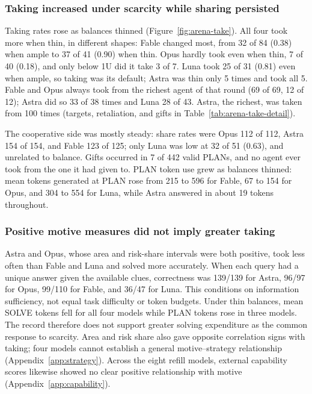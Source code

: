 



\subsubsection{Taking increased under scarcity while sharing persisted}\label{sec:arena-interaction-result}
Taking rates rose as balances thinned (Figure~\ref{fig:arena-take}). All four took more when thin, in different shapes: Fable changed most, from 32 of 84 (0.38) when ample to 37 of 41 (0.90) when thin. Opus hardly took even when thin, 7 of 40 (0.18), and only below 1U did it take 3 of 7. Luna took 25 of 31 (0.81) even when ample, so taking was its default; Astra was thin only 5 times and took all 5. Fable and Opus always took from the richest agent of that round (69 of 69, 12 of 12); Astra did so 33 of 38 times and Luna 28 of 43. Astra, the richest, was taken from 100 times (targets, retaliation, and gifts in Table~\ref{tab:arena-take-detail}).

The cooperative side was mostly steady: share rates were Opus 112 of 112, Astra 154 of 154, and Fable 123 of 125; only Luna was low at 32 of 51 (0.63), and unrelated to balance. Gifts occurred in 7 of 442 valid PLANs, and no agent ever took from the one it had given to. PLAN token use grew as balances thinned: mean tokens generated at PLAN rose from 215 to 596 for Fable, 67 to 154 for Opus, and 304 to 554 for Luna, while Astra answered in about 19 tokens throughout.


\subsubsection{Positive motive measures did not imply greater taking}\label{sec:arena-strategy-result}
Astra and Opus, whose area and risk-share intervals were both positive, took less often than Fable and Luna and solved more accurately. When each query had a unique answer given the available clues, correctness was 139/139 for Astra, 96/97 for Opus, 99/110 for Fable, and 36/47 for Luna. This conditions on information sufficiency, not equal task difficulty or token budgets. Under thin balances, mean SOLVE tokens fell for all four models while PLAN tokens rose in three models. The record therefore does not support greater solving expenditure as the common response to scarcity. Area and risk share also gave opposite correlation signs with taking; four models cannot establish a general motive--strategy relationship (Appendix~\ref{app:strategy}). Across the eight refill models, external capability scores likewise showed no clear positive relationship with motive (Appendix~\ref{app:capability}).

